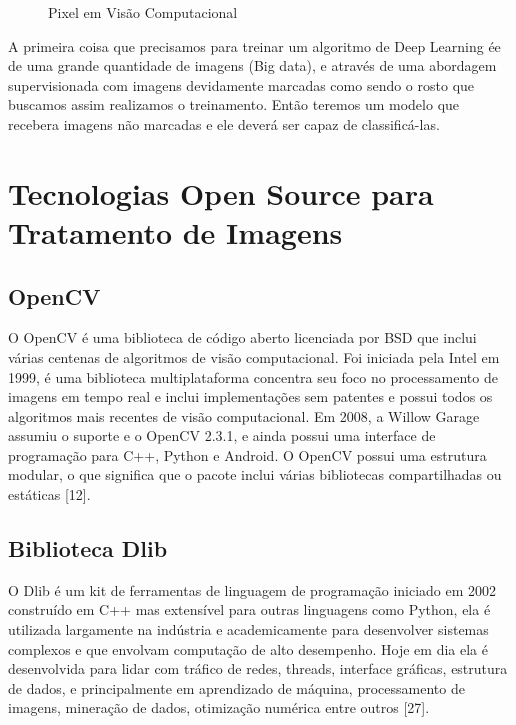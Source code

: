 \begin{figure}[H]
	\centering
	\caption{Pixel em Visão Computacional}
	\def\svgwidth{10cm}
	
	\label{fig:pixel}
\end{figure}

A primeira coisa que precisamos para treinar um algoritmo de Deep Learning ée de uma grande quantidade de imagens (Big data), e através de uma abordagem supervisionada com imagens devidamente marcadas como sendo o rosto que buscamos assim realizamos o treinamento. Então teremos um modelo que recebera imagens não marcadas e ele deverá ser capaz de classificá-las.
\section{Tecnologias Open Source para Tratamento de Imagens}

\subsection{OpenCV}
O OpenCV é uma biblioteca de código aberto licenciada por BSD que inclui várias centenas de algoritmos de visão computacional.
Foi iniciada pela Intel em 1999, é uma biblioteca multiplataforma concentra seu foco no processamento de imagens em tempo real e inclui implementações sem patentes e possui todos os algoritmos mais recentes de visão computacional. Em 2008, a Willow Garage assumiu o suporte e o OpenCV 2.3.1, e ainda possui uma interface de programação para C++, Python e Android.
O OpenCV possui uma estrutura modular, o que significa que o pacote inclui várias bibliotecas compartilhadas ou estáticas [12].
\subsection{Biblioteca Dlib}
O Dlib é um kit de ferramentas de linguagem de programação iniciado em 2002 construído em C++ mas extensível para outras linguagens como Python, ela é utilizada largamente na indústria e academicamente para desenvolver sistemas complexos e que envolvam computação de alto desempenho. Hoje em dia ela é desenvolvida para lidar com tráfico de redes, threads, interface gráficas, estrutura de dados, e principalmente em aprendizado de máquina, processamento de imagens, mineração de dados, otimização numérica entre outros [27].
